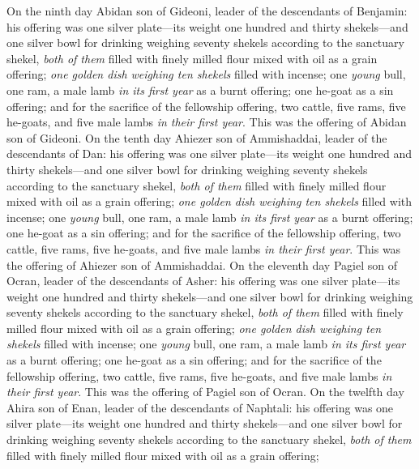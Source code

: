 \begin{biblechapter}
\verse On the ninth day Abidan son of Gideoni, leader of the descendants of Benjamin:
\verse his offering was one silver plate—its weight one hundred and thirty shekels—and one silver bowl for drinking weighing seventy shekels according to the sanctuary shekel, \textit{both of them} filled with finely milled flour mixed with oil as a grain offering;
\verse \textit{one golden dish weighing ten shekels} filled with incense;
\verse one \textit{young} bull, one ram, a male lamb \textit{in its first year} as a burnt offering;
\verse one he-goat as a sin offering;
\verse and for the sacrifice of the fellowship offering, two cattle, five rams, five he-goats, and five male lambs \textit{in their first year}. This was the offering of Abidan son of Gideoni.
\verse On the tenth day Ahiezer son of Ammishaddai, leader of the descendants of Dan:
\verse his offering was one silver plate—its weight one hundred and thirty shekels—and one silver bowl for drinking weighing seventy shekels according to the sanctuary shekel, \textit{both of them} filled with finely milled flour mixed with oil as a grain offering;
\verse \textit{one golden dish weighing ten shekels} filled with incense;
\verse one \textit{young} bull, one ram, a male lamb \textit{in its first year} as a burnt offering;
\verse one he-goat as a sin offering;
\verse and for the sacrifice of the fellowship offering, two cattle, five rams, five he-goats, and five male lambs \textit{in their first year}. This was the offering of Ahiezer son of Ammishaddai.
\verse On the eleventh day Pagiel son of Ocran, leader of the descendants of Asher:
\verse his offering was one silver plate—its weight one hundred and thirty shekels—and one silver bowl for drinking weighing seventy shekels according to the sanctuary shekel, \textit{both of them} filled with finely milled flour mixed with oil as a grain offering;
\verse \textit{one golden dish weighing ten shekels} filled with incense;
\verse one \textit{young} bull, one ram, a male lamb \textit{in its first year} as a burnt offering;
\verse one he-goat as a sin offering;
\verse and for the sacrifice of the fellowship offering, two cattle, five rams, five he-goats, and five male lambs \textit{in their first year}. This was the offering of Pagiel son of Ocran.
\verse On the twelfth day Ahira son of Enan, leader of the descendants of Naphtali:
\verse his offering was one silver plate—its weight one hundred and thirty shekels—and one silver bowl for drinking weighing seventy shekels according to the sanctuary shekel, \textit{both of them} filled with finely milled flour mixed with oil as a grain offering;

\end{biblechapter}
